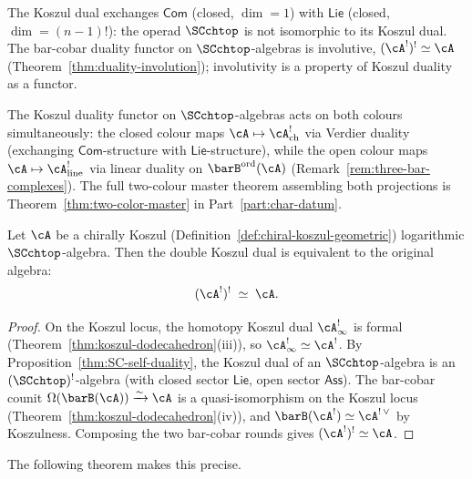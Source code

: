 \begin{remark}
\label{rem:SC-duality-functor-vs-operad}
The Koszul dual exchanges $\mathsf{Com}$ (closed, $\dim = 1$) with
$\mathsf{Lie}$ (closed, $\dim = (n-1)!$): the operad $\SCchtop$ is
not isomorphic to its Koszul dual. The bar-cobar duality functor on
$\SCchtop$-algebras is involutive, $(\cA^!)^! \simeq \cA$
(Theorem~\ref{thm:duality-involution}); involutivity is a property
of Koszul duality as a functor.
\end{remark}

The Koszul duality functor on $\SCchtop$-algebras acts on both colours
simultaneously: the closed colour maps
$\cA \mapsto \cA^!_{\mathrm{ch}}$ via Verdier duality
(exchanging $\mathsf{Com}$-structure with $\mathsf{Lie}$-structure),
while the open colour maps
$\cA \mapsto \cA^!_{\mathrm{line}}$ via linear duality on
$\barB^{\mathrm{ord}}(\cA)$
(Remark~\ref{rem:three-bar-complexes}). The full two-colour
master theorem assembling both projections is
Theorem~\ref{thm:two-color-master} in Part~\ref{part:char-datum}\@.

\begin{theorem}
\label{thm:duality-involution}
Let\/ $\cA$ be a chirally Koszul
\textup{(}Definition~\textup{\ref{def:chiral-koszul-geometric})}
logarithmic $\SCchtop$-algebra. Then the double Koszul dual
is equivalent to the original algebra:
\[
(\cA^!)^! \;\simeq\; \cA.
\]
\end{theorem}

\begin{proof}
On the Koszul locus, the homotopy Koszul dual
$\cA^!_\infty$ is formal
(Theorem~\ref{thm:koszul-dodecahedron}(iii)), so
$\cA^!_\infty \simeq \cA^!$. By
Proposition~\ref{thm:SC-self-duality}, the Koszul dual of an
$\SCchtop$-algebra is an $(\SCchtop)^!$-algebra
(with closed sector $\mathsf{Lie}$, open sector $\mathsf{Ass}$).
The bar-cobar counit
$\Omega(\barB(\cA)) \xrightarrow{\sim} \cA$ is a
quasi-isomorphism on the Koszul locus
(Theorem~\ref{thm:koszul-dodecahedron}(iv)), and
$\barB(\cA^!) \simeq \cA^{!\,\vee}$ by Koszulness.
Composing the two bar-cobar rounds gives
$(\cA^!)^! \simeq \cA$.
\end{proof}

The following theorem makes this precise.

